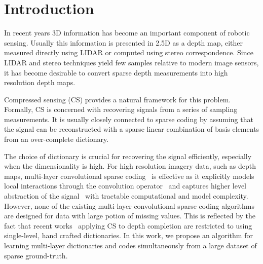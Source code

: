 \section{Introduction}
In recent years 3D information has become an important component of robotic sensing. Usually this information is presented in 2.5D as a depth map, either measured directly using LIDAR or computed using stereo correspondence. Since LIDAR and stereo techniques yield few samples relative to modern image sensors, it has become desirable to convert sparse depth measurements into high resolution depth maps.
    
Compressed sensing (CS) provides a natural framework for this problem. Formally, CS is concerned with recovering signals from a series of sampling measurements. It is usually closely connected to sparse coding by assuming that the signal can be reconstructed with a sparse linear combination of basis elements from an over-complete dictionary. 
  
The choice of dictionary is crucial for recovering the signal efficiently, especially when the dimensionality is high. For high resolution imagery data, such as depth maps, multi-layer convolutional sparse coding~\cite{} is effective as it explicitly models local interactions through the convolution operator~\cite{} and captures higher level abstraction of the signal~\cite{} with tractable computational and model complexity. However, none of the existing multi-layer convolutional sparse coding algorithms are designed for data with large potion of missing values. This is reflected by the fact that recent works~\cite{} applying CS to depth completion are restricted to using single-level, hand crafted dictionaries. In this work, we propose an algorithm for learning multi-layer dictionaries and codes simultaneously from a large dataset of sparse ground-truth.
  

